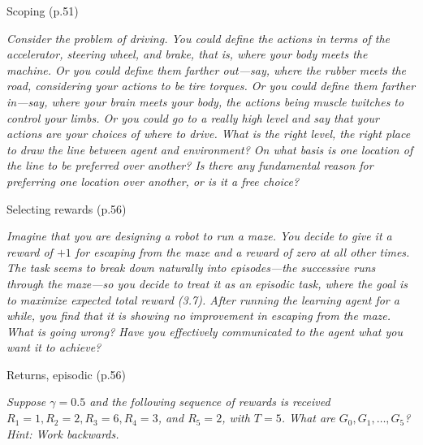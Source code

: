 \documentclass[12pt,letterpaper]{exam}
\begin{document}
\begin{questions}

	\setcounter{question}{3-1}%
	\question%
	Scoping (p.51)

	\emph{Consider the problem of driving. You could define the actions in terms of the accelerator, 
	steering wheel, and brake, that is, where your body meets the machine. 
	Or you could define them farther out—say, where the rubber meets the road, considering your actions to be tire torques. 
	Or you could define them farther in—say, where your brain meets your body, the actions being muscle twitches to control your limbs. 
	Or you could go to a really high level and say that your actions are your choices of where to drive. 
	What is the right level, the right place to draw the line between agent and environment? 
	On what basis is one location of the line to be preferred over another? 
	Is there any fundamental reason for preferring one location over another, or is it a free choice?}
	\begin{solution}
	\end{solution}

	\setcounter{question}{7-1}%
	\question%
	Selecting rewards (p.56)

	\emph{Imagine that you are designing a robot to run a maze. 
	You decide to give it a reward of \(+1\) for escaping from the maze and a reward of zero at all other times.
	The task seems to break down naturally into episodes—the successive runs through the maze—so you decide to 
	treat it as an episodic task, where the goal is to maximize expected total reward (3.7).
	After running the learning agent for a while, you find that it is showing no improvement in escaping from the maze.
	What is going wrong? Have you effectively communicated to the agent what you want it to achieve?}
	\begin{solution}
	\end{solution}

	\question%
	Returns, episodic (p.56)

	\emph{Suppose \(\gamma=0.5\) and the following sequence of rewards is received 
	\(R_1 = 1, R_2 = 2, R_3 = 6, R_4 = 3\), and \(R_5 = 2\), with \(T = 5\). What are \(G_0, G_1, \ldots, G_5\)? 
	Hint: Work backwards.}
	\begin{solution}
	\end{solution}


\end{questions}
\end{document}
